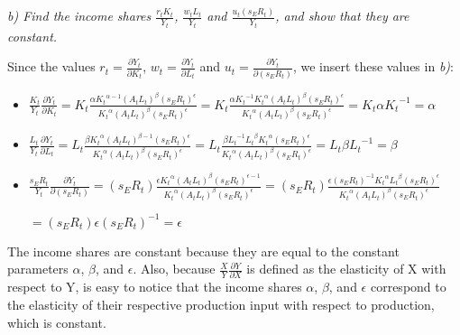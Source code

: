 \documentclass[11pt]{article} %
\begin{document}
\begin{itemize}
\end{itemize}

\pagebreak

\noindent\textit{b) Find the income shares $\frac{{r_t}{K_t}}{Y_t}$, $\frac{{w_t}{L_t}}{Y_t}$ and $\frac{{u_t}({s_E}{R_t})}{Y_t}$, and show that they are constant.} \par

\bigskip

Since the values $r_t = \frac{\partial{Y_t}}{\partial{K_t}}$, $w_t = \frac{\partial{Y_t}}{\partial{L_t}}$ and $u_t = \frac{\partial{Y_t}}{\partial({s_E}{R_t})}$, we insert these values in \textit{b)}:

\begin{itemize}

    \item $\frac{K_t}{Y_t}{\frac{\partial{Y_t}}{\partial{K_t}}} = K_t\frac{\alpha{K_t}^{\alpha-1}({A_t}{L_t})^\beta({s_E}{R_t})^\epsilon}{{K_t}^\alpha({A_t}{L_t})^\beta({s_E}{R_t})^\epsilon}
    = K_t\frac{\alpha{K_t}^{-1}{K_t}^{\alpha}({A_t}{L_t})^\beta({s_E}{R_t})^\epsilon}{{K_t}^\alpha({A_t}{L_t})^\beta({s_E}{R_t})^\epsilon}
    = {K_t}{\alpha}{K_t}^{-1} = \alpha$
    
    \bigskip
    \bigskip
    
    \item $\frac{L_t}{Y_t}{\frac{\partial{Y_t}}{\partial{L_t}}} = L_t\frac{\beta{K_t}^{\alpha}({A_t}{L_t})^{\beta-1}({s_E}{R_t})^\epsilon}{{K_t}^\alpha({A_t}{L_t})^\beta({s_E}{R_t})^\epsilon}
    = L_t\frac{\beta{L_t}^{-1}{L_t}^{\beta}{K_t}^\alpha({s_E}{R_t})^\epsilon}{{K_t}^\alpha({A_t}{L_t})^\beta({s_E}{R_t})^\epsilon}
    = {L_t}{\beta}{L_t}^{-1} = \beta$
    
    \bigskip
    \bigskip
    
    \item $\frac{{s_E}{R_t}}{Y_t}{\frac{\partial{Y_t}}{\partial({{s_E}{R_t}})}} = ({s_E}{R_t})\frac{\epsilon{K_t}^{\alpha}({A_t}{L_t})^{\beta}({s_E}{R_t})^{\epsilon-1}}{{K_t}^\alpha({A_t}{L_t})^\beta({s_E}{R_t})^\epsilon}
    =({s_E}{R_t})\frac{\epsilon({s_E}{R_t})^{-1}{K_t}^\alpha{L_t}^{\beta}({s_E}{R_t})^{\epsilon}}{{K_t}^\alpha({A_t}{L_t})^\beta({s_E}{R_t})^\epsilon}$\par
    $= ({s_E}{R_t}){\epsilon}({s_E}{R_t})^{-1} 
    = \epsilon$
    
    \bigskip
    \bigskip
    
\end{itemize}

The income shares are constant because they are equal to the constant parameters $\alpha$, $\beta$, and $\epsilon$. Also, because $\frac{X}{Y}{\frac{\partial{Y}}{\partial{X}}}$ is defined as the elasticity of X with respect to Y, is easy to notice that the income shares $\alpha$, $\beta$, and $\epsilon$ correspond to the elasticity of their respective production input with respect to production, which is constant.
\end{document}
